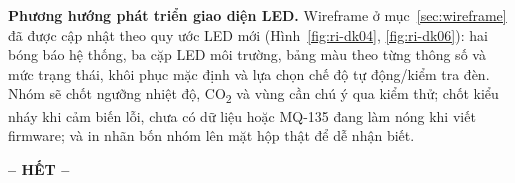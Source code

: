 \documentclass[12pt,a4paper]{article}
\begin{document}
\medskip
\textbf{Phương hướng phát triển giao diện LED.} Wireframe ở mục~\ref{sec:wireframe} đã được cập nhật theo quy ước LED mới (Hình~\ref{fig:ri-dk04}, \ref{fig:ri-dk06}): hai bóng báo hệ thống, ba cặp LED môi trường, bảng màu theo từng thông số và mức trạng thái, khôi phục mặc định và lựa chọn chế độ tự động/kiểm tra đèn. Nhóm sẽ chốt ngưỡng nhiệt độ, CO\textsubscript{2} và vùng cần chú ý qua kiểm thử; chốt kiểu nháy khi cảm biến lỗi, chưa có dữ liệu hoặc MQ-135 đang làm nóng khi viết firmware; và in nhãn bốn nhóm lên mặt hộp thật để dễ nhận biết.

\begin{center}\textbf{-- HẾT --}\end{center}

\fi
\end{document}

